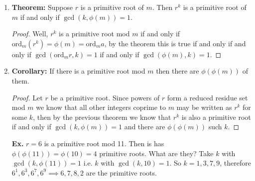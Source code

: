 \documentclass[class=article, crop=false]{standalone}
\begin{document}
\begin{enumerate}
\begin{enumerate}
\begin{proof}
\begin{itemize}
			\item Second observe:
			\begin{align*}
				a^{k \mbox{ord}_m \left(a^k\right)} &= \left(a^k\right)^{\mbox{ord}_m \left(a^k\right)} \\
				&\equiv 1\mbox{ mod }m
			\end{align*}
			So then, 
			$\mbox{ord}_m a \Big| k\mbox{ord}_m \left(a^k\right)\implies
			\frac{\mbox{ord}_m a}{\gcd(\mbox{ord}_m a, k)} \Big|
			\frac{k\cdot \mbox{ord}_m \left(a^k \right) }{\gcd(\mbox{ord}_m a, k)}$.
			Then, because $\gcd$ of two fractions is $1$ we get,
			$\frac{\mbox{ord}_m a}{\gcd(\mbox{ord}_m a, k)} \Big| \mbox{ord}_m \left(a^k\right)$,
			and so $\frac{\mbox{ord}_m a}{\gcd(\mbox{ord}_m a, k)} \leq \mbox{ord}_m \left(a^k\right)$
 		\end{itemize}
		Thus, the two results together give us that 
		$$\mbox{ord}_m \left(a^k\right) = \frac{\mbox{ord}_m a}{\gcd(\mbox{ord}_m a, k)}$$
	\end{proof}

	\item \textbf{Theorem:} Suppose $r$ is a primitive root of $m$. Then $r^k$ is a primitive root of $m$
	if and only if $\gcd(k,\phi(m))=1$.
	\begin{proof}
		Well, $r^k$ is a primitive root mod $m$ if and only if $\mbox{ord}_m \left(r^k\right) = \phi(m)=\mbox{ord}_m a$,
		by the theorem this is true if and only if and only if
		$\gcd(\mbox{ord}_m r, k)=1$ if and only if $\gcd(\phi(m), k)=1$.
	\end{proof}

	\item \textbf{Corollary:} If there is a primitive root mod $m$ then there are $\phi(\phi(m))$ of them.
	\begin{proof}
		Let $r$ be a primitive root. Since powers of $r$ form a reduced residue set mod $m$ we know that all
		other integers coprime to $m$ may be written as $r^k$ for some $k$, then by the previous theorem
		we know that $r^k$ is also a primitive root if and only if $\gcd(k,\phi(m))=1$ and there are 
		$\phi(\phi(m))$ such $k$.
	\end{proof}
	\noindent\textbf{Ex.} $r=6$ is a primitive root mod 11. Then is has $\phi(\phi(11))=\phi(10)=4$
	primitive roots. What are they? Take $k$ with $\gcd(k, \phi(11))=1$ i.e. $k$ with $\gcd(k,10)=1$.
	So $k=1,3,7,9$, therefore $6^1, 6^3, 6^7, 6^9 \implies 6,7,8,2$ are the primitive roots.
\end{enumerate}
\end{enumerate}

\end{document}
